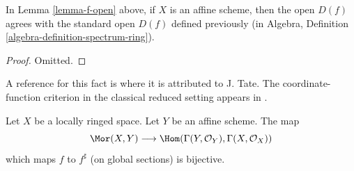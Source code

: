 \begin{lemma}
\label{lemma-f-open-affine}
In Lemma \ref{lemma-f-open} above, if $X$ is an affine scheme,
then the open $D(f)$ agrees with the standard open $D(f)$
defined previously (in
Algebra, Definition \ref{algebra-definition-spectrum-ring}).
\end{lemma}

\begin{proof}
Omitted.
\end{proof}

\begin{lemma}
\label{lemma-morphism-into-affine}
\begin{reference}
A reference for this fact is \cite[II, Err 1, Prop. 1.8.1]{EGA}
where it is attributed to J. Tate.
The coordinate-function criterion in the classical reduced setting
appears in \cite[Chapter II, \S 1, no. 32, Proposition 5, p. 225]{FAC}.
\end{reference}
Let $X$ be a locally ringed space.
Let $Y$ be an affine scheme.
The map
$$
\Mor(X, Y)
\longrightarrow
\Hom(\Gamma(Y, \mathcal{O}_Y), \Gamma(X, \mathcal{O}_X))
$$
which maps $f$ to $f^\sharp$ (on global sections) is bijective.
\end{lemma}

